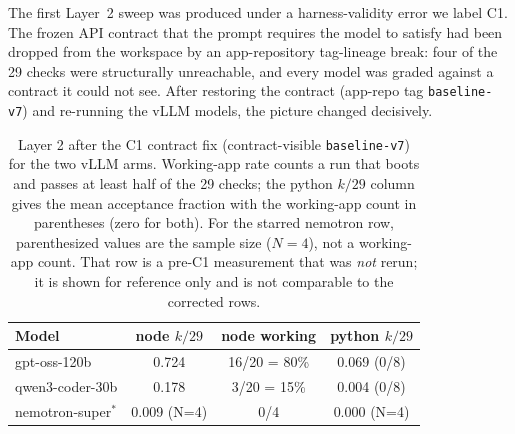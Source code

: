 \documentclass[10pt,twocolumn]{article}
\newcommand{\code}[1]{\texttt{\small #1}}
\begin{document}
The first Layer~2 sweep was produced under a harness-validity error we label C1. The frozen API
contract that the prompt requires the model to satisfy had been dropped from the workspace by an
app-repository tag-lineage break: four of the 29 checks were structurally unreachable, and every
model was graded against a contract it could not see. After restoring the contract (app-repo tag
\code{baseline-v7}) and re-running the vLLM models, the picture changed decisively.

\begin{table}[t]
\centering
\caption{Layer 2 after the C1 contract fix (contract-visible \code{baseline-v7}) for the two
vLLM arms. Working-app rate counts a run that boots and passes at least half of the 29 checks; the
python $k/29$ column gives the mean acceptance fraction with the working-app count in
parentheses (zero for both). For the starred nemotron row, parenthesized values are the sample
size ($N{=}4$), not a working-app count. That row is a pre-C1 measurement that was
\emph{not} rerun; it is shown for reference only and is not comparable to the corrected rows.}
\label{tab:l2}
\small
\begin{tabular}{@{}lccc@{}}
\toprule
Model & node $k/29$ & node working & python $k/29$ \\
\midrule
gpt-oss-120b & 0.724 & 16/20 = 80\% & 0.069 (0/8) \\
qwen3-coder-30b & 0.178 & 3/20 = 15\% & 0.004 (0/8) \\
nemotron-super$^\ast$ & 0.009 (N=4) & 0/4 & 0.000 (N=4) \\
\bottomrule
\end{tabular}
\end{table}
\end{document}
